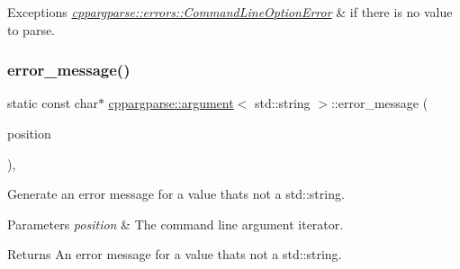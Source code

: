 \begin{DoxyExceptions}{Exceptions}
{\em \hyperlink{classcppargparse_1_1errors_1_1CommandLineOptionError}{cppargparse\+::errors\+::\+Command\+Line\+Option\+Error}} & if there is no value to parse. \\
\hline
\end{DoxyExceptions}
\mbox{\label{structcppargparse_1_1argument_3_01std_1_1string_01_4_abf0e56694e3cb65b632759217de194f1}} 
\subsubsection{\texorpdfstring{error\+\_\+message()}{error\_message()}}
{\footnotesize\ttfamily static const char$\ast$ \hyperlink{structcppargparse_1_1argument}{cppargparse\+::argument}$<$ std\+::string $>$\+::error\+\_\+message (\begin{DoxyParamCaption}\item[{const \hyperlink{types_8h_a43b4f43f8940de1bf09ced6f1b668053}{types\+::\+Command\+Line\+Position\+\_\+t} \&}]{position }\end{DoxyParamCaption})\hspace{0.3cm}{\ttfamily [inline]}, {\ttfamily [static]}}



Generate an error message for a value that\textquotesingle{}s not a std\+::string. 


\begin{DoxyParams}{Parameters}
{\em position} & The command line argument iterator.\\
\hline
\end{DoxyParams}
\begin{DoxyReturn}{Returns}
An error message for a value that\textquotesingle{}s not a std\+::string. 
\end{DoxyReturn}
\mbox{\label{structcppargparse_1_1argument_3_01std_1_1string_01_4_af0b5a5adbfd58ee818f46f5d42f6f36d}} 
